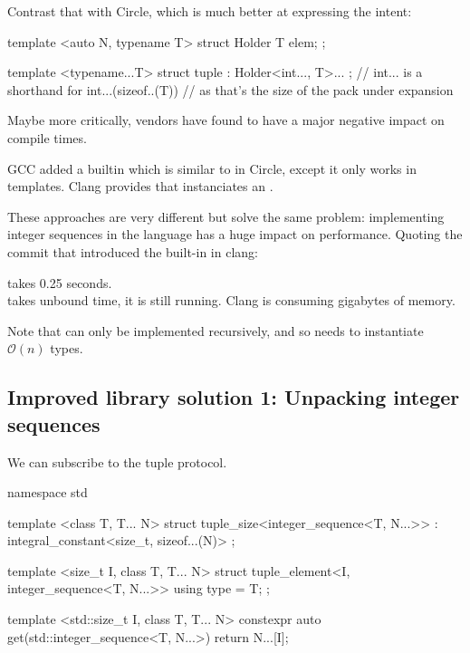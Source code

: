 \documentclass{wg21}
\begin{document}
Contrast that with Circle, which is much better at expressing the intent:

\begin{colorblock}
template <auto N, typename T>
struct Holder { T elem; };

template <typename...T>
struct tuple : Holder<int..., T>... {}; // int... is a shorthand for int...(sizeof..(T))
                                        // as that's the size of the pack under expansion
\end{colorblock}

Maybe more critically, vendors have found  to have a major negative impact on compile times.

GCC added a builtin  which is similar to  in Circle, except it only works in templates.
Clang provides  that instanciates an .

These approaches are very different but solve the same problem: implementing integer sequences in the language has a huge impact on performance.
Quoting the commit that introduced the built-in in clang:

\begin{quoteblock}
 takes 0.25
seconds.\\

 takes unbound time, it is still
running. Clang is consuming gigabytes of memory.
\end{quoteblock}

Note that  can only be implemented recursively, and so needs to instantiate
$\mathcal{O}(n)$ types.

\subsection{Improved library solution 1: Unpacking integer sequences}

We can subscribe  to the tuple protocol.

\begin{colorblock}
namespace std {
    template <class T, T... N>
    struct tuple_size<integer_sequence<T, N...>>
    : integral_constant<size_t, sizeof...(N)>
    { };

    template <size_t I,  class T, T... N>
    struct tuple_element<I, integer_sequence<T, N...>> {
        using type = T;
    };

    template <std::size_t I,  class T, T... N>
    constexpr auto get(std::integer_sequence<T, N...>) {
        return N...[I];
    }
}
\end{colorblock}
\end{document}
